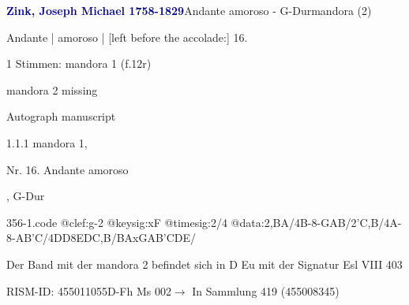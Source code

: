 \documentclass[twocolumn, 12pt]{book}
\begin{document}
\par \vspace{16pt} \textcolor{darkblue}{\textbf{Zink, Joseph Michael  1758-1829}}\hfillplus{\textbf{[356]}}\newline Andante amoroso - G-Dur\newline mandora (2)
\par \begin{itshape}[f.12r, at left:] Andante | amoroso | [left before the accolade:] 16.\end{itshape} 
\par \textcolor{darkblue}{}  1 Stimmen: mandora 1  (f.12r)\newline \begin{small} mandora 2 missing\end{small} \newline Autograph manuscript
\par 1.1.1  mandora 1, \begin{itshape}Nr. 16. Andante amoroso\end{itshape}, G-Dur  
\begin{filecontents*}{356-1.code}
@clef:g-2
@keysig:xF
@timesig:2/4
@data:2,BA/4B-8-GAB/2'C,B/4A-8-A{B'C}/4DD8EDC,B/BAxGA{B'C}DE/
\end{filecontents*}
\newline %
\par Der Band mit der mandora 2 befindet sich in D Eu mit der Signatur Esl VIII 403
\par RISM-ID: 455011055\newline D-Fh  Ms 002\newline $\rightarrow$ In Sammlung 419 (455008345)
      
\end{document}
